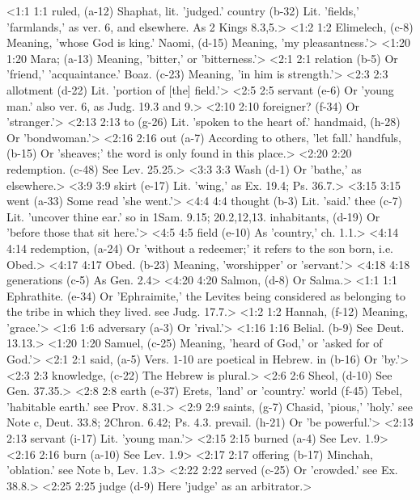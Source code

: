 <1:1 1:1  ruled, (a-12)  Shaphat, lit. 'judged.'
  country (b-32)  Lit. 'fields,' 'farmlands,' as ver. 6, and elsewhere. As 2  Kings 8.3,5.>
<1:2 1:2  Elimelech, (c-8)  Meaning, 'whose God is king.'
  Naomi, (d-15)  Meaning, 'my pleasantness.'>
<1:20 1:20  Mara; (a-13)  Meaning, 'bitter,' or 'bitterness.'>
<2:1 2:1  relation (b-5)  Or 'friend,' 'acquaintance.'
  Boaz. (c-23)  Meaning, 'in him is strength.'>
<2:3 2:3  allotment (d-22)  Lit. 'portion of [the] field.'>
<2:5 2:5  servant (e-6)  Or 'young man.' also ver. 6, as Judg. 19.3 and 9.>
<2:10 2:10  foreigner? (f-34)  Or 'stranger.'>
<2:13 2:13  to (g-26)  Lit. 'spoken to the heart of.'
  handmaid, (h-28)  Or 'bondwoman.'>
<2:16 2:16  out (a-7)  According to others, 'let fall.'
  handfuls, (b-15)  Or 'sheaves;' the word is only found in this place.>
<2:20 2:20  redemption. (c-48)  See Lev. 25.25.>
<3:3 3:3  Wash (d-1)  Or 'bathe,' as elsewhere.>
<3:9 3:9  skirt (e-17)  Lit. 'wing,' as Ex. 19.4; Ps. 36.7.>
<3:15 3:15  went (a-33)  Some read 'she went.'>
<4:4 4:4  thought (b-3)  Lit. 'said.'
  thee (c-7)  Lit. 'uncover thine ear.' so in 1Sam. 9.15; 20.2,12,13.
  inhabitants, (d-19)  Or 'before those that sit here.'>
<4:5 4:5  field (e-10)  As 'country,' ch. 1.1.>
<4:14 4:14  redemption, (a-24)  Or 'without a redeemer;' it refers to the son born, i.e.  Obed.>
<4:17 4:17  Obed. (b-23)  Meaning, 'worshipper' or 'servant.'>
<4:18 4:18  generations (c-5)  As Gen. 2.4>
<4:20 4:20  Salmon, (d-8)  Or Salma.>
<1:1 1:1  Ephrathite. (e-34)  Or 'Ephraimite,' the Levites being considered as belonging to  the tribe in which they lived. see Judg. 17.7.>
<1:2 1:2  Hannah, (f-12)  Meaning, 'grace.'>
<1:6 1:6  adversary (a-3)  Or 'rival.'>
<1:16 1:16  Belial. (b-9)  See Deut. 13.13.>
<1:20 1:20  Samuel, (c-25)  Meaning, 'heard of God,' or 'asked for of God.'>
<2:1 2:1  said, (a-5)  Vers. 1-10 are poetical in Hebrew.
  in (b-16)  Or 'by.'>
<2:3 2:3  knowledge, (c-22)  The Hebrew is plural.>
<2:6 2:6  Sheol, (d-10)  See Gen. 37.35.>
<2:8 2:8  earth (e-37)  Erets, 'land' or 'country.'
  world (f-45)  Tebel, 'habitable earth.' see Prov. 8.31.>
<2:9 2:9  saints, (g-7)  Chasid, 'pious,' 'holy.' see Note c, Deut. 33.8; 2Chron.  6.42; Ps. 4.3.
  prevail. (h-21)  Or 'be powerful.'>
<2:13 2:13  servant (i-17)  Lit. 'young man.'>
<2:15 2:15  burned (a-4) See Lev. 1.9>
<2:16 2:16  burn (a-10)  See Lev. 1.9>
<2:17 2:17  offering (b-17)  Minchah, 'oblation.' see Note b, Lev. 1.3>
<2:22 2:22  served (c-25)  Or 'crowded.' see Ex. 38.8.>
<2:25 2:25  judge (d-9)  Here 'judge' as an arbitrator.>

